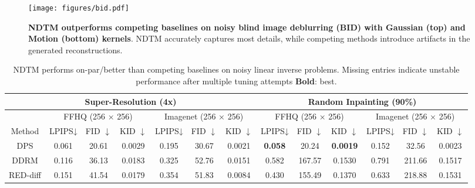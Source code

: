 \begin{figure}[t]
    \centering
    \texttt{[image: figures/bid.pdf]}
    \caption{\textbf{NDTM outperforms competing baselines on noisy blind image deblurring (BID) with Gaussian (top) and Motion (bottom) kernels}. NDTM accurately captures most details, while competing methods introduce artifacts in the generated reconstructions.}
    \label{fig:nld_bid_res}
\end{figure}





    







\begin{table*}[]
\caption{NDTM performs on-par/better than competing baselines on noisy linear inverse problems. Missing entries indicate unstable performance after multiple tuning attempts \textbf{Bold}: best.}
\small
\centering
\setlength{\tabcolsep}{4pt}
\begin{tabular}{@{}ccccccc|cccccc@{}}
\toprule
\multicolumn{7}{c|}{\textbf{Super-Resolution (4x)}}                                                                       & \multicolumn{6}{c}{\textbf{Random Inpainting (90\%)}}                                                       \\ \midrule
      & \multicolumn{3}{c|}{FFHQ (256 × 256)}                & \multicolumn{3}{c|}{Imagenet (256 × 256)}            & \multicolumn{3}{c|}{FFHQ (256 × 256)}                & \multicolumn{3}{c}{Imagenet (256 × 256)}             \\ \midrule
     Method       & LPIPS↓         & FID $\downarrow$ & KID $\downarrow$ & LPIPS↓         & FID $\downarrow$ & KID $\downarrow$ & LPIPS↓         & FID $\downarrow$ & KID $\downarrow$ & LPIPS↓         & FID $\downarrow$ & KID $\downarrow$ \\ \midrule
DPS         & 0.061          & 20.61            & 0.0029           & 0.195          & 30.67            & 0.0021           & \textbf{0.058} & 20.24            & \textbf{0.0019}  & 0.152          & 32.56            & 0.0023           \\
DDRM        & 0.116          & 36.13            & 0.0183           & 0.325          & 52.76            & 0.0151           & 0.582          & 167.57           & 0.1530           & 0.791          & 211.66           & 0.1517           \\
RED-diff    & 0.151          & 41.54            & 0.0179           & 0.354          & 51.83            & 0.0084           & 0.430          & 155.49           & 0.1370           & 0.633          & 218.88           & 0.1531           \\

\end{tabular}
\end{table*}
